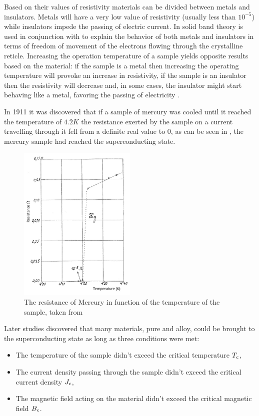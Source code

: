 Based on their values of resistivity materials can be divided between metals and insulators. Metals
will have a very low value of resistivity (usually less than $10^{-5}$) while insulators impede the
passing of electric current.
In \cite{slimani2022superconducting} solid band theory is used in conjunction with  to explain the behavior of both metals and insulators in terms of
freedom of movement of the electrons flowing through the crystalline reticle. Increasing the
operation temperature of a sample yields opposite results based on the material: if the sample is a
metal then increasing the operating temperature will provoke an increase in resistivity, if the
sample is an insulator then the resistivity will decrease and, in some cases, the insulator might
start behaving like a metal, favoring the passing of electricity \cite{slimani2022superconducting}.

In 1911 \cite{invention-superconductivity} it was discovered that if a sample of mercury was cooled
until it reached the temperature of $4.2K$ the resistance exerted by the sample on a current travelling
through it fell from a definite real value to $0$, as can be
seen in , the mercury sample had reached the superconducting state.
\begin{figure}
	\centering
	\includegraphics[width=0.5\textwidth]{./img/mercury-resistance.png}
	\caption{The resistance of Mercury in function of the temperature of the sample, taken from
		\cite{tsukerman2020compendium}}
	\label{img:mercury-resistance}
\end{figure}

Later studies discovered that many materials, pure and alloy, could be brought to the
superconducting state as long as three conditions were met:
\begin{itemize}
	\item The temperature of the sample didn't exceed the critical temperature $T_c$,
	\item The current density passing through the sample didn't exceed the critical current
	      density $J_c$,
	\item The magnetic field acting on the material didn't exceed the critical magnetic field $B_c$.
\end{itemize}

